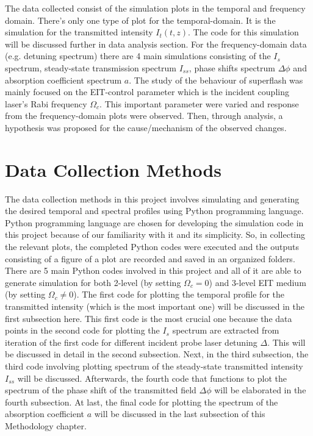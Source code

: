 The data collected consist of the simulation plots in the temporal and frequency domain. There's only one type of plot for the temporal-domain. It is the simulation for the transmitted intensity $I_{t}(t, z)$. The code for this simulation will be discussed further in data analysis section. For the frequency-domain data (e.g. detuning spectrum) there are 4 main simulations consisting of the $I_{s}$ spectrum, steady-state transmission spectrum $I_{ss}$, phase shifts spectrum $\Delta\phi$ and absorption coefficient spectrum $a$. The study of the behaviour of superflash was mainly focused on the EIT-control parameter which is the incident coupling laser's Rabi frequency $\Omega_{c}$. This important parameter were varied and response from the frequency-domain plots were observed. Then, through analysis, a hypothesis was proposed for the cause/mechanism of the observed changes.


\section{Data Collection Methods}
The data collection methods in this project involves simulating and generating the desired temporal and spectral profiles using Python programming language. Python programming language are chosen for developing the simulation code in this project because of our familiarity with it and its simplicity. So, in collecting the relevant plots, the completed Python codes were executed and the outputs consisting of a figure of a plot are recorded and saved in an organized folders. There are 5 main Python codes involved in this project and all of it are able to generate simulation for both 2-level (by setting $\Omega_{c} = 0$) and 3-level EIT medium (by setting $\Omega_{c} \neq 0$). The first code for plotting the temporal profile for the transmitted intensity (which is the most important one) will be discussed in the first subsection here. This first code is the most crucial one because the data points in the second code for plotting the $I_{s}$ spectrum are extracted from iteration of the first code for different incident probe laser detuning $\Delta$. This will be discussed in detail in the second subsection. Next, in the third subsection, the third code involving plotting spectrum of the steady-state transmitted intensity $I_{ss}$ will be discussed. Afterwards, the fourth code that functions to plot the spectrum of the phase shift of the transmitted field $\Delta\phi$ will be elaborated in the fourth subsection. At last, the final code for plotting the spectrum of the absorption coefficient $a$ will be discussed in the last subsection of this Methodology chapter.

